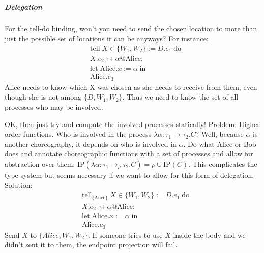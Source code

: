 \documentclass{article}
\theoremstyle{definition}
\begin{document}
\subparagraph{Delegation}
For the tell-do binding, won't you need to send the chosen location to more than just the possible set of locations it can be anyways? For instance:
\begin{align*}
	&\text{tell}\; X \in \{W_1,W_2\} := D.e_1 \;\text{do}\\
	&X.e_2 \rightsquigarrow \alpha @ \text{Alice};\\
	&\text{let}\; \text{Alice}.x := \alpha \;\text{in}\\
	&\text{Alice}.e_3
\end{align*}
Alice needs to know which X was chosen as she needs to receive from them, even though she is not among $\{D,W_1,W_2\}$. Thus we need to know the set of all processes who may be involved.

OK, then just try and compute the involved processes statically! Problem: Higher order functions. Who is involved in the process $\lambda \alpha : \tau_1 \rightarrow \tau_2.C$? Well, because $\alpha$ is another choreography, it depends on who is involved in $\alpha$. Do what Alice or Bob does and annotate choreographic functions with a set of processes and allow for abstraction over them: $\text{IP}(\lambda \alpha : \tau_1 \rightarrow_\rho \tau_2.C) = \rho \cup \text{IP}(C)$. This complicates the type system but seems necessary if we want to allow for this form of delegation.
Solution:
\begin{align*}
	&\text{tell}_{\{\text{Alice}\}}\; X \in \{W_1,W_2\} := D.e_1 \;\text{do}\\
	&X.e_2 \rightsquigarrow \alpha @ \text{Alice};\\
	&\text{let}\; \text{Alice}.x := \alpha \;\text{in}\\
	&\text{Alice}.e_3
\end{align*}
Send $X$ to $\{Alice, W_1, W_2\}$. If someone tries to use $X$ inside the body and we didn't sent it to them, the endpoint projection will fail.
\end{document}
